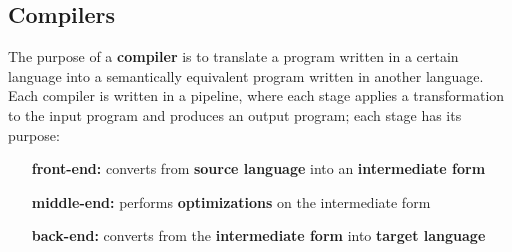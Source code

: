 \subsection{Compilers}

The purpose of a \textbf{compiler} is to translate a program written in a certain language into a semantically equivalent program written in another language.
Each compiler is written in a pipeline, where each stage applies a transformation to the input program and produces an output program;
each stage has its purpose:

\begin{minipage}[m]{0.695\textwidth}
  \begin{enumerate}[leftmargin=*, labelindent=1em, widest*=11]
    \item[\textbf{front-end:}] converts from \textbf{source language} into an \textbf{intermediate form}
    \item[\textbf{middle-end:}] performs \textbf{optimizations} on the intermediate form
    \item[\textbf{back-end:}] converts from the \textbf{intermediate form} into \textbf{target language}
  \end{enumerate}
\end{minipage}
\begin{minipage}[m]{0.3\textwidth}
  \centering
\end{minipage}